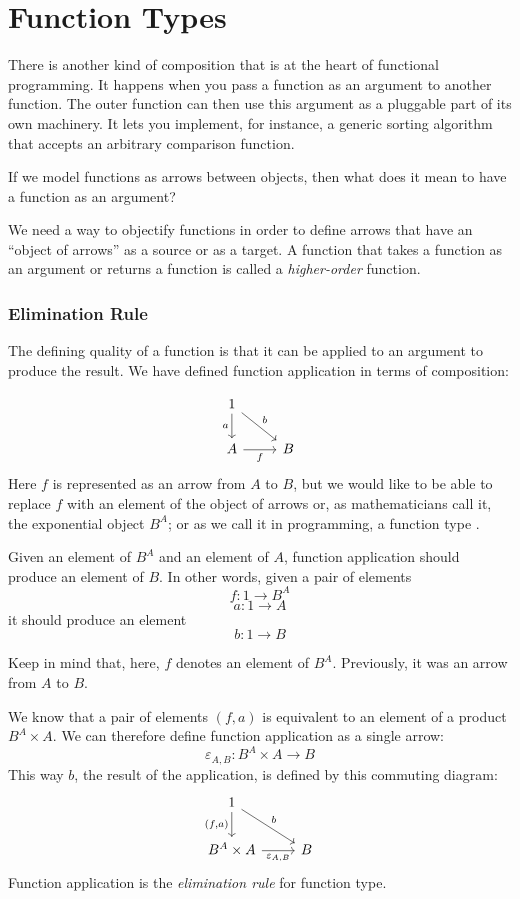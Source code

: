\documentclass[DaoFP]{subfiles}
\begin{document}
\setcounter{chapter}{5}

\chapter{Function Types}

There is another kind of composition that is at the heart of functional programming. It happens when you pass a function as an argument to another function. The outer function can then use this argument as a pluggable part of its own machinery. It lets you implement, for instance, a generic sorting algorithm that accepts an arbitrary comparison function. 

If we model functions as arrows between objects, then what does it mean to have a function as an argument? 

We need a way to objectify functions in order to define arrows that have an ``object of arrows'' as a source or as a target. A function that takes a function as an argument or returns a function is called a \emph{higher-order} function.

\subsection{Elimination Rule}

The defining quality of a function is that it can be applied to an argument to produce the result. We have defined function application in terms of composition:

\[
 \begin{tikzcd}
 1
 \arrow[d, "a"']
 \arrow[rd, "b"]
 \\
 A
 \arrow[r, "f"']
& B
 \end{tikzcd}
\]
Here $f$ is represented as an arrow from $A$ to $B$, but we would like to be able to replace $f$ with an element of the object of arrows or, as mathematicians call it, the exponential object $B^A$; or as we call it in programming, a function type . 

Given an element of $B^A$ and an element of $A$, function application should produce an element of $B$. In other words, given a pair of elements
\[f \colon 1 \to B^A\]
\[a \colon 1 \to A\]
it should produce an element
\[b \colon 1 \to B \]

Keep in mind that, here, $f$ denotes an element of $B^A$. Previously, it was an arrow from $A$ to $B$.

We know that a pair of elements $(f, a)$ is equivalent to an element of a product $B^A \times A$. We can therefore define function application as a single arrow:
\[\varepsilon_{A, B} \colon B^A \times A \to B\]
This way $b$, the result of the application, is defined by this commuting diagram:
\[
 \begin{tikzcd}
 1
 \arrow[d, "{(f, a)}"']
 \arrow[rd, "b"]
 \\
 B^A \times A
 \arrow[r, "\varepsilon_{A, B}"']
& B
 \end{tikzcd}
\]
Function application is the \emph{elimination rule} for function type. 
\end{document}
